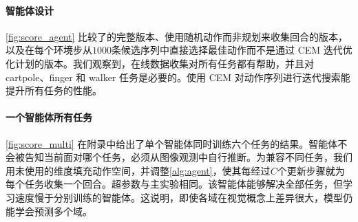 \paragraph{智能体设计}

\cref{fig:score_agent} 比较了\method 的完整版本、使用随机动作而非规划来收集回合的版本，以及在每个环境步从$1000$条候选序列中直接选择最佳动作而不是通过 CEM 迭代优化计划的版本。我们观察到，在线数据收集对所有任务都有帮助，并且对 cartpole、finger 和 walker 任务是必要的。使用 CEM 对动作序列进行迭代搜索能提升所有任务的性能。

\paragraph{一个智能体所有任务}

\cref{fig:score_multi} 在附录中给出了单个智能体同时训练六个任务的结果。智能体不会被告知当前面对哪个任务，必须从图像观测中自行推断。为兼容不同任务，我们用未使用的维度填充动作空间，并调整\cref{alg:agent}，使其每经过$C$个更新步骤就为每个任务收集一个回合。超参数与主实验相同。该智能体能够解决全部任务，但学习速度慢于分别训练的智能体。这说明，即使各域在视觉概念上差异很大，模型仍能学会预测多个域。



